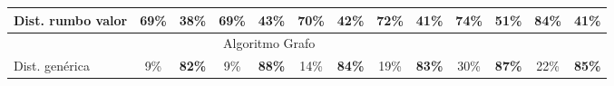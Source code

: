 \documentclass[12pt,a4paper]{article}
\begin{document}
\begin{table}[H]
{\begin{tabular}{l|cc|cc|cc|cc|cc|cc|}
\rowcolor[rgb]{0.925,0.957,1} Dist. rumbo valor                                                                                                                                               & \textcolor[rgb]{0,0.502,0}{69\%}                   & 38\%                                               & \textcolor[rgb]{0,0.502,0}{69\%}                   & 43\%                                               & \textcolor[rgb]{0,0.502,0}{70\%}                   & 42\%                                               & \textcolor[rgb]{0,0.502,0}{72\%}                   & 41\%                                               & \textcolor[rgb]{0,0.502,0}{74\%}                   & 51\%                                               & \textcolor[rgb]{0,0.502,0}{84\%}                   & 41\%                                                \\ 
\hline
\multicolumn{13}{c}{{\cellcolor[rgb]{0.796,0.808,0.984}}Algoritmo Grafo~ ~ ~ ~ ~ ~ ~~}                                                                                                                                                                                                                                                                                                                                                                                                                                                                                                                                                                                                                                                                                                                                                                     \\ 
\hline
\rowcolor[rgb]{0.925,0.957,1} Dist. genérica                                                                                                                                                  & 9\%                                                & \textbf{\textbf{\textcolor[rgb]{0,0.502,0}{82\%}}} & 9\%                                                & \textbf{\textbf{\textcolor[rgb]{0,0.502,0}{88\%}}} & 14\%                                               & \textbf{\textbf{\textcolor[rgb]{0,0.502,0}{84\%}}} & 19\%                                               & \textbf{\textbf{\textcolor[rgb]{0,0.502,0}{83\%}}} & 30\%                                               & \textbf{\textbf{\textcolor[rgb]{0,0.502,0}{87\%}}} & 22\%                                               & \textbf{\textbf{\textcolor[rgb]{0,0.502,0}{85\%}}}  \\

\end{tabular}}
\end{table}
\end{document}
